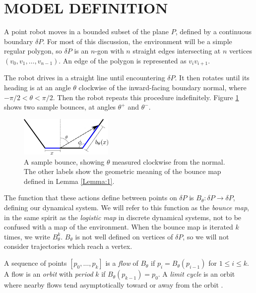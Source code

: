 \documentclass[letterpaper, 10 pt, conference]{ieeeconf}  %
\begin{document}
\section{MODEL DEFINITION\label{model}}

A point robot moves in a bounded subset of the plane $P$,
defined by a continuous boundary $\delta P$. For most 
of this discussion, the environment will be a simple regular polygon, so $\delta P$ 
is an $n$-gon with $n$ straight edges intersecting at $n$ vertices
$(v_0, v_1, \ldots, v_{n-1})$.  An edge of the polygon is represented as $v_i
v_{i+1}$.

The robot drives in a straight line until encountering $\delta P$. It then rotates
until its heading is at an angle $\theta$ clockwise of the inward-facing boundary
normal, where $-\pi/2 < \theta < \pi/2$. Then the robot repeats this procedure
indefinitely. Figure \ref{bounce_def} shows two sample bounces, at
angles $\theta^+$ and $\theta^-$.

\begin{figure}[thpb]
  \centering
  \includegraphics[width=0.4\textwidth]{../figs/simple_bounce_def.pdf}
  \caption{A sample bounce, showing $\theta$ measured clockwise from the normal. The other labels show the geometric meaning of the
    bounce map defined in Lemma \ref{Lemma:1}.}
  \label{bounce_def}
\end{figure}

The function that these actions define between points
on $\delta P$ is $B_{\theta}: \delta P \to \delta P$, defining our dynamical system.
We will refer to this function as the \textit{bounce map}, in the same spirit as
the \textit{logistic map} in discrete dynamical systems, not to be confused with
a map of the environment.
When the bounce map is iterated $k$ times, we write $B^k_{\theta}$.
$B_{\theta}$ is not well defined
on vertices of $\delta P$, so we will not consider trajectories which reach a
vertex.

A sequence of points $[p_0, \ldots, p_k]$ is a \textit{flow} of $B_{\theta}$ if
$p_i = B_{\theta}(p_{i-1})$ for $1 \leq i \leq k$. A flow is an \textit{orbit}
with \textit{period} $k$ if $B_{\theta}(p_{k-1}) = p_0$. A \textit{limit
cycle} is an orbit where nearby flows tend asymptotically toward or away from
the orbit \cite{jackson1992}.
\end{document}
